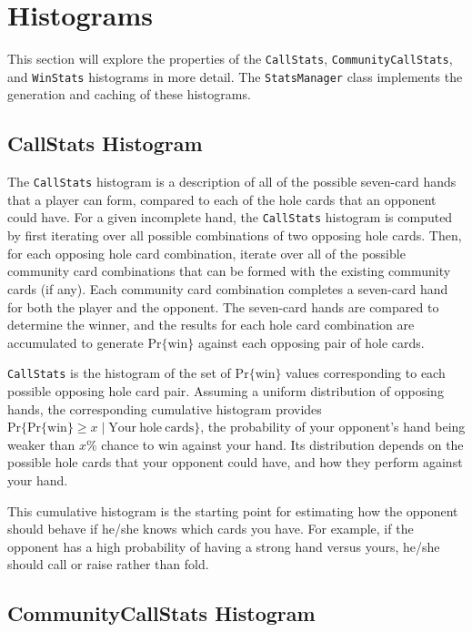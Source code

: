 \section{Histograms}
\label{sec:Histograms}

This section will explore the properties of the \texttt{CallStats}, \texttt{CommunityCallStats}, and \texttt{WinStats} histograms in more detail.
The \texttt{StatsManager} class implements the generation and caching of these histograms.

\subsection{CallStats Histogram}
\label{sec:CallStats}

The \texttt{CallStats} histogram is a description of all of the possible seven-card hands that a player can form, compared to each of the hole cards that an opponent could have.
For a given incomplete hand, the \texttt{CallStats} histogram is computed by first iterating over all possible combinations of two opposing hole cards.
Then, for each opposing hole card combination, iterate over all of the possible community card combinations that can be formed with the existing community cards (if any).
Each community card combination completes a seven-card hand for both the player and the opponent.
The seven-card hands are compared to determine the winner, and the results for each hole card combination are accumulated to generate $\mathrm{Pr\{win\}}$ against each opposing pair of hole cards.

\texttt{CallStats} is the histogram of the set of $\mathrm{Pr\{win\}}$ values corresponding to each possible opposing hole card pair.
Assuming a uniform distribution of opposing hands, the corresponding cumulative histogram provides $\mathrm{Pr}\{\mathrm{Pr\{win\}} \ge x \; | \; \mathrm{Your\:hole\:cards}\}$, the probability of your opponent's hand being weaker than $x$\% chance to win against your hand.
Its distribution depends on the possible hole cards that your opponent could have, and how they perform against your hand.

This cumulative histogram is the starting point for estimating how the opponent should behave if he/she knows which cards you have.
For example, if the opponent has a high probability of having a strong hand versus yours, he/she should call or raise rather than fold.


\subsection{CommunityCallStats Histogram}
\label{sec:CommunityCallStats}


